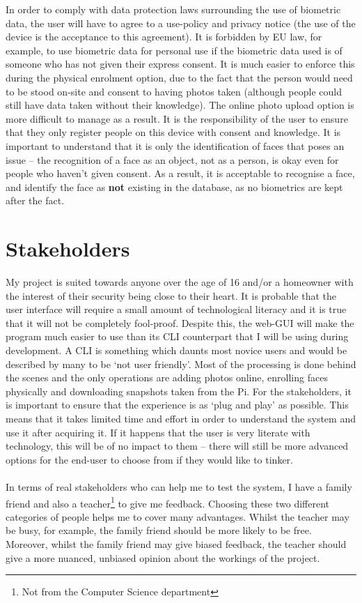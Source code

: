 \documentclass[9pt]{article}
\begin{document}
In order to comply with data protection laws surrounding the use of biometric data, the user will have to agree to a use-policy and privacy notice (the use of the device is the acceptance to this agreement). It is forbidden by EU law, for example, to use biometric data for personal use if the biometric data used is of someone who has not given their express consent. It is much easier to enforce this during the physical enrolment option, due to the fact that the person would need to be stood on-site and consent to having photos taken (although people could still have data taken without their knowledge). The online photo upload option is more difficult to manage as a result. It is the responsibility of the user to ensure that they only register people on this device with consent and knowledge. It is important to understand that it is only the identification of faces that poses an issue -- the recognition of a face as an object, not as a person, is okay even for people who haven't given consent. As a result, it is acceptable to recognise a face, and identify the face as \textbf{not} existing in the database, as no biometrics are kept after the fact.

\section{Stakeholders}\label{sec_stakeholders}
My project is suited towards anyone over the age of 16 and/or a homeowner with the interest of their security being close to their heart. It is probable that the user interface will require a small amount of technological literacy and it is true that it will not be completely fool-proof. Despite this, the web-GUI will make the program much easier to use than its CLI counterpart that I will be using during development. A CLI is something which daunts most novice users and would be described by many to be `not user friendly’. Most of the processing is done behind the scenes and the only operations are adding photos online, enrolling faces physically and downloading snapshots taken from the Pi. For the stakeholders, it is important to ensure that the experience is as `plug and play' as possible. This means that it takes limited time and effort in order to understand the system and use it after acquiring it. If it happens that the user is very literate with technology, this will be of no impact to them -- there will still be more advanced options for the end-user to choose from if they would like to tinker.\\\\
In terms of real stakeholders who can help me to test the system, I have a family friend and also a teacher\footnote{Not from the Computer Science department} to give me feedback. Choosing these two different categories of people helps me to cover many advantages. Whilst the teacher may be busy, for example, the family friend should be more likely to be free. Moreover, whilst the family friend may give biased feedback, the teacher should give a more nuanced, unbiased opinion about the workings of the project.
\end{document}
